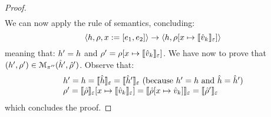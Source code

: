 \begin{proof}
$$\begin{array}{l}
\end{array}
$$
We can now apply the  rule of \jsil semantics, concluding: 
$$
   \semtrans{\heap, \store, \jvar := [\jsilexpr_1, \jsilexpr_2]}{\heap,  \store[\jvar \mapsto \semexpr{\sexprv_k}{\senv}]}
$$
meaning that: $\heap' = \heap$ and $\store' = \store[\jvar \mapsto \semexpr{\sexprv_k}{\senv}]$.
We have now to prove that $(\heap', \store') \in \smodels{\sheap', \sstore'}{\pc''}$.
Observe that: 
$$
\begin{array}{l}
\heap' = \heap = \semexpr{\sheap}{\senv}   = \semexpr{\sheap'}{\senv}  \text{ (because $\heap' = \heap$ and $ \sheap = \sheap'$)}
\\
 \store' =  \semexpr{\sstore}{\senv}[\jvar \mapsto \symbeval{\sexprv_k}{\senv}] 
    =  \semexpr{\sstore[\jvar \mapsto \sexprv_k]}{\senv} 
    =  \semexpr{\sstore'}{\senv}
\end{array}
$$
 which concludes the proof. 
\vspace{6pt}


\end{proof}
